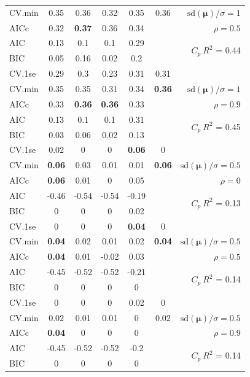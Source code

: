 \documentclass[12pt]{article}
\newcommand{\mr}[1]{\mathrm{#1}}
\newcommand{\bm}[1]{\mathbf{#1}}
\begin{document}
\begin{table}[p]
\begin{center}
\begin{tabular}{l*{5}{c}|r}
CV.min & 0.35 & 0.36 & 0.32 & 0.35 & 0.36 &  $\mr{sd}(\bm{\mu})/\sigma=1$ \\
AICc & 0.32 & {\bf 0.37} & 0.36 & 0.34 & & $\rho=0.5$ \\
AIC & 0.13 & 0.1 & 0.1 & 0.29 & & \multirow{2}{*}{$C_p ~ R^2$ = 0.44} \\
BIC & 0.05 & 0.16 & 0.02 & 0.2 & & \\
 \hline 
CV.1se & 0.29 & 0.3 & 0.23 & 0.31 & 0.31 &\\
CV.min & 0.35 & 0.35 & 0.31 & 0.34 & {\bf 0.36} &  $\mr{sd}(\bm{\mu})/\sigma=1$ \\
AICc & 0.33 & {\bf 0.36} & {\bf 0.36} & 0.33 & & $\rho=0.9$ \\
AIC & 0.13 & 0.1 & 0.1 & 0.31 & & \multirow{2}{*}{$C_p ~ R^2$ = 0.45} \\
BIC & 0.03 & 0.06 & 0.02 & 0.13 & & \\
 \hline 
CV.1se & 0.02 & 0 & 0 & {\bf 0.06} & 0 &\\
CV.min & {\bf 0.06} & 0.03 & 0.01 & 0.01 & {\bf 0.06} &  $\mr{sd}(\bm{\mu})/\sigma=0.5$ \\
AICc & {\bf 0.06} & 0.01 & 0 & 0.05 & & $\rho=0$ \\
AIC & -0.46 & -0.54 & -0.54 & -0.19 & & \multirow{2}{*}{$C_p ~ R^2$ = 0.13} \\
BIC & 0 & 0 & 0 & 0.02 & & \\
 \hline 
CV.1se & 0 & 0 & 0 & {\bf 0.04} & 0 &\\
CV.min & {\bf 0.04} & 0.02 & 0.01 & 0.02 & {\bf 0.04} &  $\mr{sd}(\bm{\mu})/\sigma=0.5$ \\
AICc & {\bf 0.04} & 0.01 & -0.02 & 0.03 & & $\rho=0.5$ \\
AIC & -0.45 & -0.52 & -0.52 & -0.21 & & \multirow{2}{*}{$C_p ~ R^2$ = 0.14} \\
BIC & 0 & 0 & 0 & 0 & & \\
 \hline 
CV.1se & 0 & 0 & 0 & 0.02 & 0 &\\
CV.min & 0.02 & 0.01 & 0.01 & 0 & 0.02 &  $\mr{sd}(\bm{\mu})/\sigma=0.5$ \\
AICc & {\bf 0.04} & 0 & 0 & 0 & & $\rho=0.9$ \\
AIC & -0.45 & -0.52 & -0.52 & -0.2 & & \multirow{2}{*}{$C_p ~ R^2$ = 0.14} \\
BIC & 0 & 0 & 0 & 0 & & \\
 \hline 
\end{tabular}
\end{center}
\vspace{-1cm}
\end{table}
\end{document}
